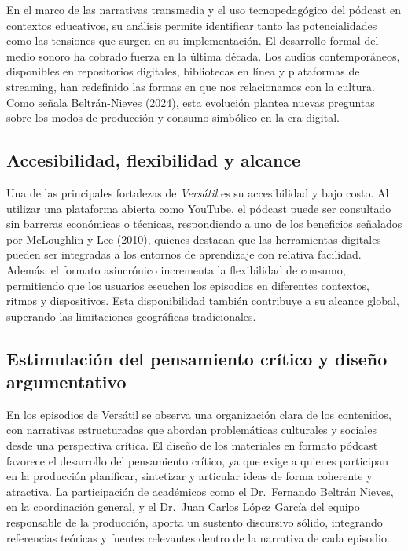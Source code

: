 \documentclass[
]{interact}
\begin{document}
En el marco de las narrativas transmedia y el uso tecnopedagógico del
pódcast en contextos educativos, su análisis permite identificar tanto
las potencialidades como las tensiones que surgen en su implementación.
El desarrollo formal del medio sonoro ha cobrado fuerza en la última
década. Los audios contemporáneos, disponibles en repositorios
digitales, bibliotecas en línea y plataformas de streaming, han
redefinido las formas en que nos relacionamos con la cultura. Como
señala Beltrán-Nieves (2024), esta evolución plantea nuevas preguntas
sobre los modos de producción y consumo simbólico en la era digital.

\subsection{Accesibilidad, flexibilidad y
alcance}\label{accesibilidad-flexibilidad-y-alcance}

Una de las principales fortalezas de \emph{Versátil} es su accesibilidad
y bajo costo. Al utilizar una plataforma abierta como YouTube, el
pódcast puede ser consultado sin barreras económicas o técnicas,
respondiendo a uno de los beneficios señalados por McLoughlin y Lee
(2010), quienes destacan que las herramientas digitales pueden ser
integradas a los entornos de aprendizaje con relativa facilidad. Además,
el formato asincrónico incrementa la flexibilidad de consumo,
permitiendo que los usuarios escuchen los episodios en diferentes
contextos, ritmos y dispositivos. Esta disponibilidad también contribuye
a su alcance global, superando las limitaciones geográficas
tradicionales.

\subsection{Estimulación del pensamiento crítico y diseño
argumentativo}\label{estimulaciuxf3n-del-pensamiento-cruxedtico-y-diseuxf1o-argumentativo}

En los episodios de Versátil se observa una organización clara de los
contenidos, con narrativas estructuradas que abordan problemáticas
culturales y sociales desde una perspectiva crítica. El diseño de los
materiales en formato pódcast favorece el desarrollo del pensamiento
crítico, ya que exige a quienes participan en la producción planificar,
sintetizar y articular ideas de forma coherente y atractiva. La
participación de académicos como el Dr.~Fernando Beltrán Nieves, en la
coordinación general, y el Dr.~Juan Carlos López García del equipo
responsable de la producción, aporta un sustento discursivo sólido,
integrando referencias teóricas y fuentes relevantes dentro de la
narrativa de cada episodio.
\end{document}
